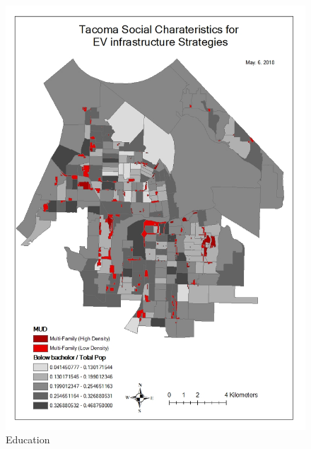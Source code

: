 \documentclass[]{article}
\begin{document}
\begin{figure}
\centering
\includegraphics{./figs/education.jpg}
\caption{Education}
\end{figure}
\end{document}
